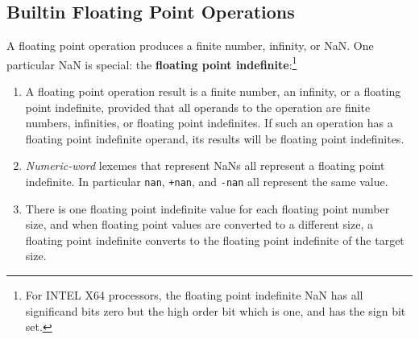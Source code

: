 \documentclass[12pt]{article}
\newcommand{\key}[1]{{\rm \bfseries #1}}
\begin{document}
\subsection{Builtin Floating Point Operations}
\label{BUILTIN-FLOATING-POINT-OPERATIONS}

A floating point operation produces a finite number, infinity,
or NaN.  One particular NaN is special:
the \key{floating point indefinite}:\footnote{
For INTEL X64 processors, the floating point indefinite NaN has all
significand bits zero but the high order bit which is one, and has
the sign bit set.}
\begin{enumerate}
\item A floating point operation result is a finite number, an infinity,
or a floating point indefinite, provided that all operands to the operation
are finite numbers, infinities, or floating point indefinites.  If such
an operation has a floating point indefinite operand, its results will be
floating point indefinites.
\item {\em Numeric-word} lexemes that represent NaNs all represent
a floating point indefinite.  In particular {\tt nan}, {\tt +nan},
and {\tt -nan} all represent the same value.
\item There is one floating point indefinite value for each floating point
number size, and when floating point values are converted to a different
size, a floating point indefinite converts to the floating point indefinite
of the target size.
\end{enumerate}
\end{document}

